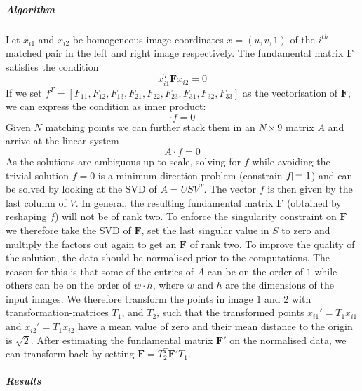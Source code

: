 \documentclass{paper}
\begin{document}
\subparagraph{Algorithm}
Let $x_{i1}$ and $x_{i2}$ be homogeneous image-coordinates $x=(u,v,1)$ of  the $i^{th}$ matched pair in the left and right image respectively. The fundamental matrix $\mathbf{F}$ satisfies the condition
\begin{equation} 
x_{i1}^T\mathbf{F}x_{i2} = 0
\end{equation}
If we set $f^T=[F_{11},F_{12},F_{13},F_{21},F_{22},F_{23},F_{31},F_{32},F_{33}]$ as the vectorisation of $\mathbf{F}$, we can express the condition as inner product:
\begin{equation} 
[u_{i2}u_{i1}, u_{i2}v_{i1}, u_{i2}, v_{i2}u_{i1}, v_{i2}v_{i1}, v_{i2}, u_{i1}, v_{i1}, 1]\cdot f = 0
\end{equation}
Given $N$ matching points we can further stack them in an $N\times9$ matrix $A$ and arrive at the linear system 
\begin{equation} 
A\cdot f = 0
\label{eq:linsys}
\end{equation}
As the solutions are ambiguous up to scale, solving for $f$ while avoiding the trivial solution $f=0$ is a minimum direction problem (constrain $\vline f\vline=1$) and can be solved by looking at the SVD of $A=USV^T$. The vector $f$ is then given by the last column of $V$.
In general, the resulting fundamental matrix $\mathbf{F}$ (obtained by reshaping $f$) will not be of rank two. To enforce the singularity constraint on $\mathbf{F}$ we therefore take the SVD of $\mathbf{F}$, set the last singular value in $S$ to zero and multiply the factors out again to get an $\mathbf{F}$ of rank two.
To improve the quality of the solution, the data should be normalised prior to the computations. The reason for this is that some of the entries of $A$ can be on the order of $1$ while others can be on the order of $w\cdot h$, where $w$ and $h$ are the dimensions of the input images. We therefore transform the points in image 1 and 2 with transformation-matrices $T_1$, and $T_2$, such that the transformed points $x_{i1}'=T_1x_{i1}$ and $x_{i2}'=T_1x_{i2}$ have a mean value of zero and their mean distance to the origin is $\sqrt{2}$. After estimating the fundamental matrix $\mathbf{F'}$ on the normalised data, we can transform back by setting $\mathbf{F}=T_2^T\mathbf{F'}T_1$.

\subparagraph{Results}
\end{document}
